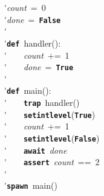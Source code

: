\'\>\textit{count}~=~0\\

\'\>\textit{done}~=~\texttt{\textbf{False}}\\

\'\>\\

\'\>\texttt{\textbf{def}}~handler():\\

\'\>~~~~\textit{count}~+=~1\\

\'\>~~~~\textit{done}~=~\texttt{\textbf{True}}\\

\'\>\\

\'\>\texttt{\textbf{def}}~main():\\

\'\>~~~~\texttt{\textbf{trap}}~handler()\\

\'\>~~~~\texttt{\textbf{setintlevel}}(\texttt{\textbf{True}})\\

\'\>~~~~\textit{count}~+=~1\\

\'\>~~~~\texttt{\textbf{setintlevel}}(\texttt{\textbf{False}})\\

\'\>~~~~\texttt{\textbf{await}}~\textit{done}\\

\'\>~~~~\texttt{\textbf{assert}}~\textit{count}~==~2\\

\'\>\\

\'\>\texttt{\textbf{spawn}}~main()